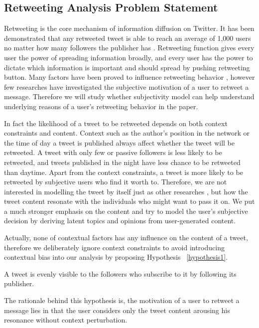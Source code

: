 \documentclass[smallcondensed]{svjour3}     %
\begin{document}
\subsection{Retweeting Analysis Problem Statement}
\label{statement}
Retweeting is the core mechanism of information diffusion on Twitter. It has been demonstrated that any retweeted tweet is able to reach an average of 1,000 users no matter how many followers the publisher has \cite{Kwak:2010TSN}. Retweeting function gives every user the power of spreading information broadly, and every user has the power to dictate which information is important and should spread by pushing retweeting button. Many factors have been proved to influence retweeting behavior \cite{Suh2010,conf/icwsm/MacskassyM11,Comarela:2012UFA}, however few researches have investigated the subjective motivation of a user to retweet a message. Therefore we will study whether subjectivity model  can help understand underlying reasons of a user's retweeting behavior in the paper.

In fact the likelihood of a tweet to be retweeted depends on both context constraints and content. 
Context such as the author's position in the network or the time of day a tweet is published always affect whether the tweet will be retweeted. A tweet with only few or passive followers is less likely to be retweeted, and tweets published in the night have less chance to be retweeted than daytime.
Apart from the context constraints, a tweet is more likely to be retweeted by subjective users who find it worth to. Therefore, we are not interested in modelling the tweet by itself just as other researches \cite{Naveed:2011SMC,2011:NaveedGKC,conf/icwsm/PfitznerGS12}, but how the tweet content resonate with the individuals who might want to pass it on. We put a much stronger emphasis on the content and try to model the user's subjective decision by deriving latent topics and opinions from user-generated content. 
 
Actually, none of contextual factors has any influence on the content of a tweet, therefore we deliberately ignore context constraints to avoid introducing contextual bias into our analysis by proposing  Hypothesis ~\ref{hypothesis1}. 
\begin{hypothesis}[H1]
\label{hypothesis1}
A tweet is evenly visible to the followers who subscribe to it by following its publisher.
\end{hypothesis}
The rationale behind this hypothesis is, the motivation of a user to retweet a message lies in that the user considers only the tweet content arousing his resonance without context perturbation.
\end{document}
